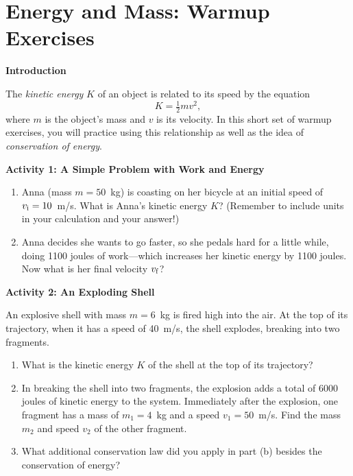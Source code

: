 \section{Energy and Mass: Warmup Exercises}
\label{lab_energy_mass_warmup}
\makelabheader %

\bigskip

\textbf{Introduction}

The \textit{kinetic energy} $K$ of an object is related to its speed by the equation
\begin{equation}
K=\tfrac{1}{2}mv^2,
\end{equation}
where $m$ is the object's mass and $v$ is its velocity.  In this short set of warmup exercises, you will practice using this relationship as well as the idea of \textit{conservation of energy}.

\bigskip

\textbf{Activity 1: A Simple Problem with Work and Energy}
\begin{enumerate}[labparts]
\item Anna (mass $m=50$~kg) is coasting on her bicycle at an initial speed of $v_{\rm i}=10$~m/s.  What is Anna's kinetic energy $K$?  (Remember to include units in your calculation and your answer!)
\answerspace{0.8in}

\item Anna decides she wants to go faster, so she pedals hard for a little while, doing 1100 joules of work---which increases her kinetic energy by 1100 joules.  Now what is her final velocity $v_{\rm f}$?
\answerspace{0.8in}
\end{enumerate}

\textbf{Activity 2: An Exploding Shell}


An explosive shell with mass $m=6$~kg is fired high into the air.  At the top of its trajectory, when it has a speed of 40~m/s, the shell explodes, breaking into two fragments.

\begin{enumerate}[labparts]
\item What is the kinetic energy $K$ of the shell at the top of its trajectory?
\answerspace{0.8in}

\item In breaking the shell into two fragments, the explosion adds a total of 6000 joules of kinetic energy to the system.  Immediately after the explosion, one fragment has a mass of $m_1=4$~kg and a speed $v_1=50$~m/s.  Find the mass $m_2$ and speed $v_2$ of the other fragment.
\answerspace{1.8in}

\item What additional conservation law did you apply in part (b) besides the conservation of energy?
\answerspace{0.8in}
\end{enumerate}

